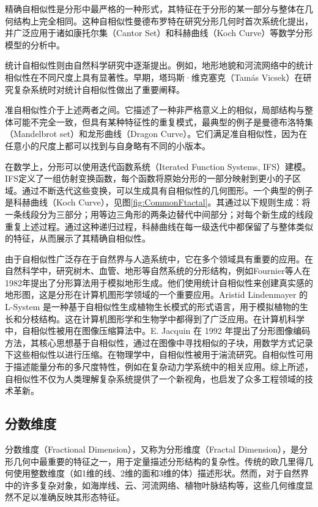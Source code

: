 精确自相似性是分形中最严格的一种形式，其特征在于分形的某一部分与整体在几何结构上完全相同。这种自相似性曼德布罗特\cite{Mandelbrot1982}在研究分形几何时首次系统化提出，并广泛应用于诸如康托尔集（Cantor Set）\cite{georg1883uber}和科赫曲线（Koch Curve）\cite{koch1904courbe}等数学分形模型的分析中。

统计自相似性则由自然科学研究中逐渐提出。例如，地形地貌和河流网络中的统计相似性在不同尺度上具有显著性。早期，塔玛斯·维克塞克（Tamás Vicsek）在研究复杂系统时对统计自相似性做出了重要阐释\cite{barabasi1991multifractality}。

准自相似性介于上述两者之间。它描述了一种非严格意义上的相似，局部结构与整体可能不完全一致，但具有某种特征性的重复模式，最典型的例子是曼德布洛特集（Mandelbrot set）和龙形曲线（Dragon Curve）。它们满足准自相似性，因为在任意小的尺度上都可以找到与自身略有不同的小版本。

在数学上，分形可以使用迭代函数系统（Iterated Function Systems, IFS）建模。IFS定义了一组仿射变换函数，每个函数将原始分形的一部分映射到更小的子区域。通过不断迭代这些变换，可以生成具有自相似性的几何图形。一个典型的例子是科赫曲线（Koch Curve）\cite{koch1904courbe}，见图\ref{fig:CommonFtactal}。其通过以下规则生成：将一条线段分为三部分；用等边三角形的两条边替代中间部分；对每个新生成的线段重复上述过程。通过这种递归过程，科赫曲线在每一级迭代中都保留了与整体类似的特征，从而展示了其精确自相似性。

由于自相似性广泛存在于自然界与人造系统中，它在多个领域具有重要的应用。在自然科学中，研究树木、血管、地形等自然系统的分形结构，例如Fournier等人在1982年提出了分形算法用于模拟地形生成。他们使用统计自相似性来创建真实感的地形图，这是分形在计算机图形学领域的一个重要应用\cite{fournier1982computer}。Aristid Lindenmayer 的 L-System 是一种基于自相似性生成植物生长模式的形式语言，用于模拟植物的生长和分枝结构。这在计算机图形学和生物学中都得到了广泛应用\cite{lindenmayer1968mathematical}。在计算机科学中，自相似性被用在图像压缩算法中。E. Jacquin 在 1992 年提出了分形图像编码方法，其核心思想基于自相似性，通过在图像中寻找相似的子块，用数学方式记录下这些相似性以进行压缩\cite{jacquin1992image}。在物理学中，自相似性被用于湍流研究。自相似性可用于描述能量分布的多尺度特性，例如在复杂动力学系统中的相关应用\cite{feder2013fractals}。综上所述，自相似性不仅为人类理解复杂系统提供了一个新视角，也启发了众多工程领域的技术革新。

\subsection{分数维度}
分数维度（Fractional Dimension），又称为分形维度（Fractal Dimension），是分形几何中最重要的特征之一，用于定量描述分形结构的复杂性。传统的欧几里得几何使用整数维度（如1维的线、2维的面和3维的体）描述形状。然而，对于自然界中的许多复杂对象，如海岸线、云、河流网络、植物叶脉结构等，这些几何维度显然不足以准确反映其形态特征。

